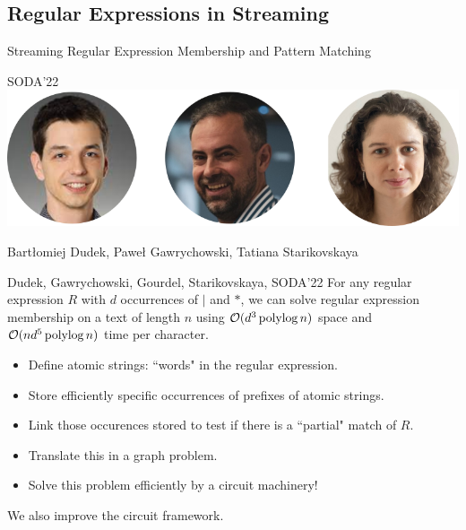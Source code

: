 \subsection{Regular Expressions in Streaming}
\begin{frame}
  \centering
  {\Large Streaming Regular Expression Membership and Pattern Matching}

  \bigskip
  {\large SODA'22}\\
  \bigskip
  \includegraphics{pictures/mindmap/regexp.png}

  \bigskip
  Bartłomiej Dudek, Paweł Gawrychowski, Tatiana Starikovskaya
\end{frame}


\begin{frame}{}

    \begin{myalertblock}{Dudek, Gawrychowski, Gourdel, Starikovskaya, SODA'22}
        For any regular expression $R$ with $d$ occurrences of $|$ and $\ast$, we can solve regular expression membership on a text of length $n$ using $\mathcal{O}(d^{3}\operatorname{polylog} n)$ space and $\mathcal{O}(nd^{5}\operatorname{polylog} n)$ time per character.
    \end{myalertblock}
    
    \medskip
    
    \begin{itemize}
    \item Define atomic strings: ``words" in the regular expression.
    
    \item Store efficiently specific occurrences of prefixes of atomic strings.
    
    \item Link those occurences stored to test if there is a ``partial" match of $R$.
    
    \item Translate this in a graph problem.
    
    \item Solve this problem efficiently by a circuit machinery!
    \end{itemize} 
    We also improve the circuit framework.
\end{frame}


